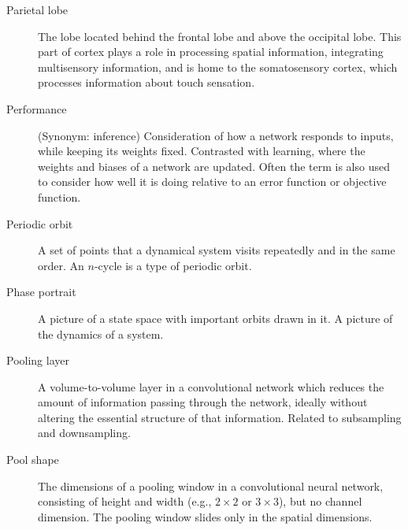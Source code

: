 \begin{description}
\item[Parietal lobe] The lobe located behind the frontal lobe and above the occipital lobe. This part of cortex plays a role in processing spatial information, integrating multisensory information, and is home to the somatosensory cortex, which processes information about touch sensation.

%
%

\item[Performance] (Synonym: inference) Consideration of how a network responds to inputs, while keeping its weights fixed. Contrasted with learning, where the weights and biases of a network are updated. Often the term is also used to consider how well it is doing relative to an error function or objective function.

\item[Periodic orbit] A set of points that a dynamical system visits repeatedly and in the same order. An $n$-cycle is a type of periodic orbit.


\item[Phase portrait] A picture of a state space with important orbits drawn in it. A picture of the dynamics of a system.

\item[Pooling layer] A volume-to-volume layer in a convolutional network which reduces the amount of information passing through the network, ideally without altering the essential structure of that information. Related to subsampling and downsampling.

\item[Pool shape] The dimensions of a pooling window in a convolutional neural network, consisting of height and width (e.g., $2 \times 2$ or $3 \times 3$), but no channel dimension. The pooling window slides only in the spatial dimensions.


\end{description}
